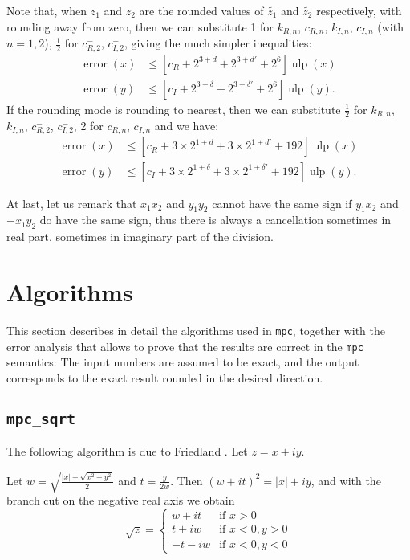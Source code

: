 \documentclass {article}
\newcommand {\corr}[1]{\widetilde {#1}}
\newcommand {\mpc}{{\tt mpc}}
\newcommand {\Ulp}{{\operatorname {ulp}}}
\newcommand{\error}{\operatorname {error}}
\renewcommand {\leq}{\leqslant}
\begin{document}
Note that, when $z_1$ and $z_2$ are the rounded values of $\corr{z_1}$
and $\corr{z_2}$ respectively, with rounding away from zero, then we can
substitute 1 for $k_{R,n}$, $c_{R,n}$, $k_{I,n}$, $c_{I,n}$ (with $n=1,2$),
$\frac{1}{2}$ for $c_{R,2}^-$, $c_{I,2}^-$, giving the much simpler
inequalities:
\begin{align*}
\error(x) &\leq [c_R + 2^{3+d} + 2^{3+d'} + 2^6] \Ulp(x)\\
\error(y) &\leq [c_I + 2^{3+\delta} + 2^{3+\delta'} + 2^6] \Ulp(y).
\end{align*}
If the rounding mode is rounding to nearest, then we can substitute
$\frac{1}{2}$ for $k_{R,n}$, $k_{I,n}$, $c_{R,2}^-$, $c_{I,2}^-$, 2 for
$c_{R,n}$, $c_{I,n}$ and we have:
\begin{align*}
\error(x) &\leq [c_R + 3\times 2^{1+d} +3\times 2^{1+d'} + 192] \Ulp(x)\\
\error(y) &\leq [c_I + 3\times 2^{1+\delta} +3\times 2^{1+\delta'} + 192]
\Ulp(y).
\end{align*}

At last, let us remark that $x_1x_2$ and $y_1y_2$ cannot have the same
sign if $y_1x_2$ and $-x_1y_2$ do have the same sign, thus there is
always a cancellation sometimes in real part, sometimes in imaginary
part of the division.


\section {Algorithms}

This section describes in detail the algorithms used in \mpc, together with the error analysis that allows to prove that the results are correct in the {\mpc} semantics: The input numbers are assumed to be exact, and the output corresponds to the exact result rounded in the desired direction.


\subsection {\texttt {mpc\_sqrt}}

The following algorithm is due to Friedland \cite{Friedland67,Smith98}.
Let $z = x + i y$.

Let $w = \sqrt { \frac {|x| + \sqrt {x^2 + y^2}}{2}}$ and
$t = \frac {y}{2w}$. Then $(w + it)^2 = |x| + iy$, and with the branch cut on the negative real axis we obtain
\[
\sqrt z = \left\{
\begin {array}{cl}
w + i t & \text {if } x > 0 \\
t + i w & \text {if } x < 0, y > 0 \\
-t - i w & \text {if } x < 0, y < 0
\end {array}
\right.
\]
\end{document}
